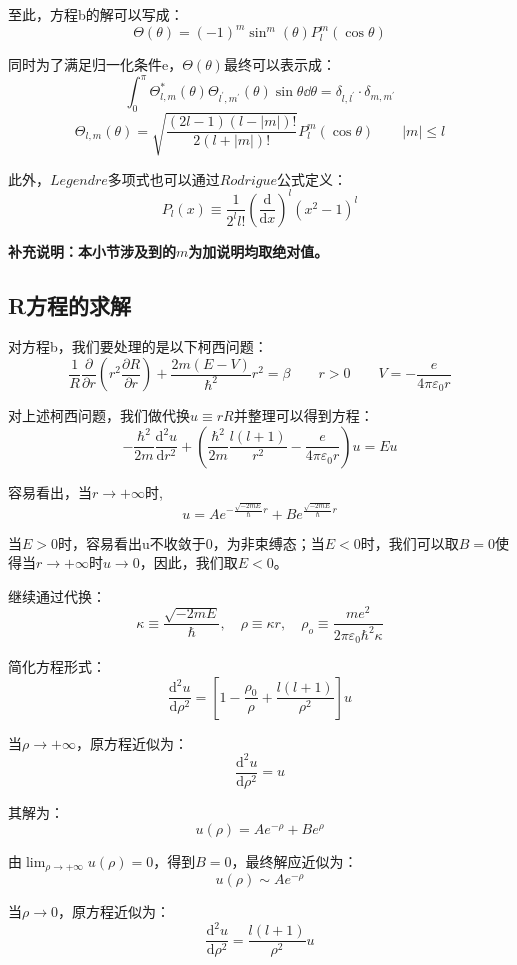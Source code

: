 至此，方程b的解可以写成：
\[\Theta(\theta)=(-1)^m\sin^m(\theta)P^m_l(\cos\theta)\]

同时为了满足归一化条件e，$\Theta(\theta)$最终可以表示成：
\[\int_0^{\pi}\Theta_{l,m}^{*}(\theta)\Theta_{l^{'},m^{'}}(\theta)\sin\theta \dd\theta=\delta_{l,l^{'}} \cdot \delta_{m,m^{'}} \tag{e}\]
\[\Theta_{l,m}(\theta)=\sqrt{\frac{(2l-1)(l-|m|)!}{2(l+|m|)!}}P^{m}_l(\cos\theta) \qquad |m| \leqslant l\]

此外，$Legendre$多项式也可以通过$Rodrigue$公式定义：
\[P_l(x) \equiv \frac{1}{2^ll!} \left ( \frac{\mathrm{d}}{\mathrm{d}x} \right )^l(x^2-1)^l\]

\textbf{补充说明：本小节涉及到的$m$为加说明均取绝对值。}

\subsection{R方程的求解}

对方程b，我们要处理的是以下柯西问题：
\[\frac{1}{R}\frac{\partial}{\partial{r}}(r^2\frac{\partial R}{\partial{r}})+\frac{2m(E-V)}{\hbar^2}r^2=\beta \qquad r>0 \qquad V=-\frac{e}{4 \pi \varepsilon_0 r}\]

对上述柯西问题，我们做代换$u \equiv rR$并整理可以得到方程：
\[-\frac{\hbar^2}{2m}\frac{\mathrm{d^2}u}{\mathrm{d}r^2}+ \left (\frac{\hbar^2}{2m}\frac{l(l+1)}{r^2}-\frac{e}{4 \pi \varepsilon_0r} \right )u=Eu\]

容易看出，当$r \rightarrow +\infty$时,
\[u=Ae^{-\frac{\sqrt{-2mE}}{\hbar}r}+Be^{\frac{\sqrt{-2mE}}{\hbar}r}\]

当$E>0$时，容易看出u不收敛于0，为非束缚态；当$E<0$时，我们可以取$B=0$使得当$r \rightarrow +\infty$时$u \rightarrow 0$，因此，我们取$E<0$。

继续通过代换：
\[\kappa \equiv \frac{\sqrt{-2mE}}{\hbar}, \quad \rho \equiv \kappa r, \quad \rho_o \equiv \frac{me^2}{2 \pi \varepsilon_0 \hbar^2 \kappa}\]

简化方程形式：
\[\frac{\mathrm{d^2}u}{\mathrm{d}\rho^2}=\left [ 1-\frac{\rho_0}{\rho}+\frac{l(l+1)}{\rho^2} \right ]u\]

当$\rho \rightarrow +\infty$，原方程近似为：
\[\frac{\mathrm{d^2}u}{\mathrm{d}\rho^2}=u\]

其解为：
\[u(\rho)=Ae^{-\rho}+Be^{\rho}\]

由$\lim_{\rho \rightarrow +\infty}u(\rho)=0$，得到$B=0$，最终解应近似为：
\[u(\rho) \sim Ae^{-\rho}\]

当$\rho \rightarrow 0$，原方程近似为：
\[\frac{\mathrm{d^2}u}{\mathrm{d}\rho^2}=\frac{l(l+1)}{\rho^2}u\]

